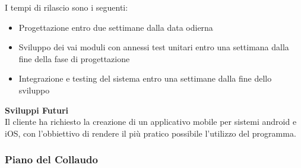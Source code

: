 I tempi di rilascio sono i seguenti:
\begin{itemize}
    \item Progettazione entro due settimane dalla data odierna
    \item Sviluppo dei vai moduli con annessi test unitari entro una settimana dalla fine della fase di progettazione
    \item Integrazione e testing del sistema entro una settimane dalla fine dello sviluppo
\end{itemize}
\hfill \break

\textbf{Sviluppi Futuri}
\\

Il cliente ha richiesto la creazione di un applicativo mobile per sistemi
android e iOS, con l'obbiettivo di rendere il più pratico possibile l'utilizzo
del programma.

\newpage
\subsubsection{Piano del Collaudo}

